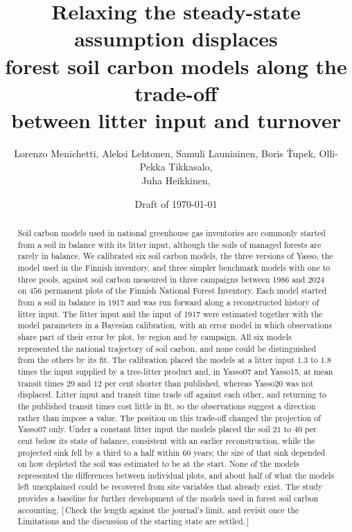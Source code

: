 \documentclass[11pt]{article}
\title{\vspace{-1.2cm}Relaxing the steady-state assumption displaces\\
forest soil carbon models along the trade-off\\
between litter input and turnover}
\author{Lorenzo Menichetti, Aleksi Lehtonen, Samuli Launiainen, Boris {\v T}upek,
        Olli-Pekka Tikkasalo, \\
        Juha Heikkinen, \gap{possibly others; order and affiliations to be decided;
        Mikko Peltoniemi to be asked}}
\date{Draft of \today}
\newcommand{\gap}[1]{\textcolor{red!70!black}{\small[\,#1\,]}}
\begin{document}
\maketitle

\begin{abstract}
Soil carbon models used in national greenhouse gas inventories are commonly started
from a soil in balance with its litter input, although the soils of managed forests are
rarely in balance. We calibrated six soil carbon models, the three versions of Yasso,
the model used in the Finnish inventory, and three simpler benchmark models with one to
three pools, against soil carbon measured in three campaigns between 1986 and 2024 on
$456$ permanent plots of the Finnish National Forest Inventory. Each model started from a
soil in balance in 1917 and was run forward along a reconstructed history of litter
input. The litter input and the input of 1917 were estimated together with the model
parameters in a Bayesian calibration, with an error model in which observations share
part of their error by plot, by region and by campaign. All six models represented the
national trajectory of soil carbon, and none could be distinguished from the others by
its fit. The calibration placed the models at a litter input $1.3$ to $1.8$ times the
input supplied by a tree-litter product and, in Yasso07 and Yasso15, at mean transit
times $29$ and $12$ per cent shorter than published, whereas Yasso20 was not displaced.
Litter input and transit time trade off against each other, and returning to the
published transit times cost little in fit, so the observations suggest a direction
rather than impose a value. The position on this trade-off changed the projection of
Yasso07 only. Under a constant litter input the models placed the soil $21$ to $40$ per
cent below its state of balance, consistent with an earlier reconstruction, while the
projected sink fell by a third to a half within $60$ years; the size of that sink depended
on how depleted the soil was estimated to be at the start. None of the models
represented the differences between individual plots, and about half of what the models
left unexplained could be recovered from site variables that already exist. The study
provides a baseline for further development of the models used in forest soil carbon
accounting.
\gap{Check the length against the journal's limit, and revisit once the Limitations and
the discussion of the starting state are settled.}
\end{abstract}
\end{document}
